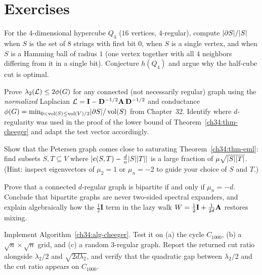 \section{Exercises}
\label{ch34:exercises}

\begin{exercise}
For the $4$-dimensional hypercube $Q_4$ ($16$ vertices, $4$-regular), compute $\lvert\partial S\rvert/\lvert S\rvert$ when $S$ is the set of $8$ strings with first bit $0$, when $S$ is a single vertex, and when $S$ is a Hamming ball of radius $1$ (one vertex together with all $4$ neighbors differing from it in a single bit). Conjecture $h(Q_4)$ and argue why the half-cube cut is optimal.
\end{exercise}

\begin{exercise}
Prove $\lambda_2(\mathcal{L})\le 2\phi(G)$ for any connected (not necessarily regular) graph using the \emph{normalized} Laplacian $\mathcal{L}=\mathbf{I}-\mathbf{D}^{-1/2}\mathbf{A}\,\mathbf{D}^{-1/2}$ and conductance $\phi(G)=\min_{0<\operatorname{vol}(S)\le\operatorname{vol}(V)/2}\lvert\partial S\rvert/\operatorname{vol}(S)$ from Chapter~32. Identify where $d$-regularity was used in the proof of the lower bound of Theorem~\ref{ch34:thm-cheeger} and adapt the test vector accordingly.
\end{exercise}

\begin{exercise}
Show that the Petersen graph comes close to saturating Theorem~\ref{ch34:thm-eml}: find subsets $S,T\subseteq V$ where $\lvert e(S,T)-\tfrac{d}{n}\lvert S\rvert\lvert T\rvert\rvert$ is a large fraction of $\mu\sqrt{\lvert S\rvert\lvert T\rvert}$. (Hint: inspect eigenvectors of $\mu_2=1$ or $\mu_n=-2$ to guide your choice of $S$ and $T$.)
\end{exercise}

\begin{exercise}
\label{ch34:ex-bipartite}
Prove that a connected $d$-regular graph is bipartite if and only if $\mu_n=-d$. Conclude that bipartite graphs are never two-sided spectral expanders, and explain algebraically how the $\tfrac{1}{2}\mathbf{I}$ term in the lazy walk $W=\tfrac{1}{2}\mathbf{I}+\tfrac{1}{2d}\mathbf{A}$ restores mixing.
\end{exercise}

\begin{exercise}
Implement Algorithm~\ref{ch34:alg-cheeger}. Test it on (a) the cycle $C_{1000}$, (b) a $\sqrt{n}\times\sqrt{n}$ grid, and (c) a random $3$-regular graph. Report the returned cut ratio alongside $\lambda_2/2$ and $\sqrt{2d\lambda_2}$, and verify that the quadratic gap between $\lambda_2/2$ and the cut ratio appears on $C_{1000}$.
\end{exercise}

